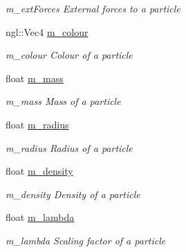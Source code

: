\begin{DoxyCompactItemize}
\begin{DoxyCompactList}\small\item\em m\+\_\+ext\+Forces External forces to a particle \end{DoxyCompactList}\item 
ngl\+::\+Vec4 \hyperlink{structParticle_a28fb9bc37248c0463a84fe1a302bfb18}{m\+\_\+colour}\hypertarget{structParticle_a28fb9bc37248c0463a84fe1a302bfb18}{}\label{structParticle_a28fb9bc37248c0463a84fe1a302bfb18}

\begin{DoxyCompactList}\small\item\em m\+\_\+colour Colour of a particle \end{DoxyCompactList}\item 
float \hyperlink{structParticle_ab78b76aeb4d163132a0c27ea4c5beb75}{m\+\_\+mass}\hypertarget{structParticle_ab78b76aeb4d163132a0c27ea4c5beb75}{}\label{structParticle_ab78b76aeb4d163132a0c27ea4c5beb75}

\begin{DoxyCompactList}\small\item\em m\+\_\+mass Mass of a particle \end{DoxyCompactList}\item 
float \hyperlink{structParticle_af6aee0d324572f74a1bdc28937d04a0b}{m\+\_\+radius}\hypertarget{structParticle_af6aee0d324572f74a1bdc28937d04a0b}{}\label{structParticle_af6aee0d324572f74a1bdc28937d04a0b}

\begin{DoxyCompactList}\small\item\em m\+\_\+radius Radius of a particle \end{DoxyCompactList}\item 
float \hyperlink{structParticle_a7ef5758b3dbc3ea263b670012f0c2fe5}{m\+\_\+density}\hypertarget{structParticle_a7ef5758b3dbc3ea263b670012f0c2fe5}{}\label{structParticle_a7ef5758b3dbc3ea263b670012f0c2fe5}

\begin{DoxyCompactList}\small\item\em m\+\_\+density Density of a particle \end{DoxyCompactList}\item 
float \hyperlink{structParticle_a253dea0d4438cac9831c22f75c2b8163}{m\+\_\+lambda}\hypertarget{structParticle_a253dea0d4438cac9831c22f75c2b8163}{}\label{structParticle_a253dea0d4438cac9831c22f75c2b8163}

\begin{DoxyCompactList}\small\item\em m\+\_\+lambda Scaling factor of a particle \end{DoxyCompactList}\end{DoxyCompactItemize}


